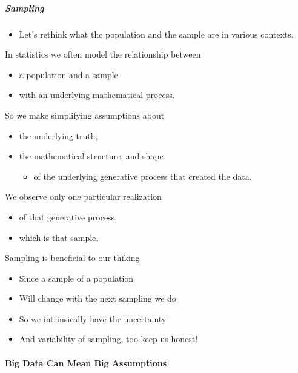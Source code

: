 \documentclass[]{article}
\providecommand{\tightlist}{%
  \setlength{\itemsep}{0pt}\setlength{\parskip}{0pt}}
\let\oldparagraph\paragraph
\renewcommand{\paragraph}[1]{\oldparagraph{#1}\mbox{}}
\let\oldsubparagraph\subparagraph
\renewcommand{\subparagraph}[1]{\oldsubparagraph{#1}\mbox{}}
\begin{document}
\subparagraph{Sampling}\label{sampling}

\begin{itemize}
\tightlist
\item
  Let's rethink what the population and the sample are in various
  contexts.
\end{itemize}

In statistics we often model the relationship between

\begin{itemize}
\tightlist
\item
  a population and a sample
\item
  with an underlying mathematical process.
\end{itemize}

So we make simplifying assumptions about

\begin{itemize}
\tightlist
\item
  the underlying truth,
\item
  the mathematical structure, and shape

  \begin{itemize}
  \tightlist
  \item
    of the underlying generative process that created the data.
  \end{itemize}
\end{itemize}

We observe only one particular realization

\begin{itemize}
\tightlist
\item
  of that generative process,
\item
  which is that sample.
\end{itemize}

Sampling is beneficial to our thiking

\begin{itemize}
\tightlist
\item
  Since a sample of a population
\item
  Will change with the next sampling we do
\item
  So we intrinsically have the uncertainty
\item
  And variability of sampling, too keep us honest!
\end{itemize}

\paragraph{Big Data Can Mean Big
Assumptions}\label{big-data-can-mean-big-assumptions}
\end{document}

